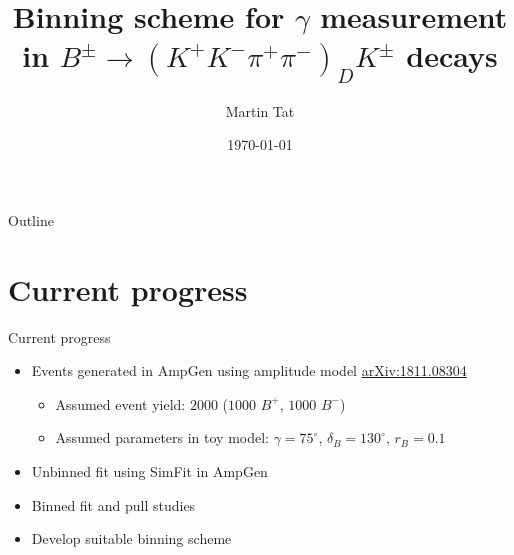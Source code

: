 \documentclass{beamer}
\title[$B^\pm\to(K^+K^-\pi^+\pi^-)_DK^\pm$]{Binning scheme for \texorpdfstring{$\gamma$}{gamma} measurement in \texorpdfstring{$B^\pm\to(K^+K^-\pi^+\pi^-)_DK^\pm$}{B to K+K-pi+pi-} decays}
\author{Martin Tat}
\institute{Oxford LHCb}
\date{\today}
\begin{document}
\begin{frame}
  \titlepage
\end{frame}

\begin{frame}{Outline}
  \tableofcontents
\end{frame}

\section{Current progress}
\begin{frame}{Current progress}
  \begin{itemize}
    \item{Events generated in AmpGen using amplitude model \href{https://arxiv.org/abs/1811.08304}{arXiv:1811.08304}}
    \begin{itemize}
      \item{Assumed event yield: $2000$ ($1000$ $B^+$, $1000$ $B^-$)}
      \item{Assumed parameters in toy model: $\gamma = 75^\circ$, $\delta_B = 130^\circ$, $r_B = 0.1$}
    \end{itemize}
    \item{Unbinned fit using SimFit in AmpGen}
    \item{Binned fit and pull studies}
    \item{Develop suitable binning scheme}
  \end{itemize}
\end{frame}
\end{document}
